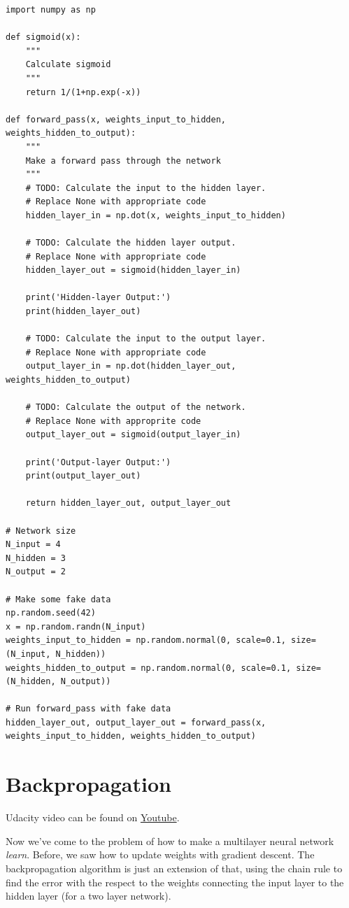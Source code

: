 \begin{lstlisting}
import numpy as np

def sigmoid(x):
    """
    Calculate sigmoid
    """
    return 1/(1+np.exp(-x))

def forward_pass(x, weights_input_to_hidden, weights_hidden_to_output):
    """
    Make a forward pass through the network
    """
    # TODO: Calculate the input to the hidden layer.
    # Replace None with appropriate code
    hidden_layer_in = np.dot(x, weights_input_to_hidden)
    
    # TODO: Calculate the hidden layer output.
    # Replace None with appropriate code
    hidden_layer_out = sigmoid(hidden_layer_in)
    
    print('Hidden-layer Output:')
    print(hidden_layer_out)
    
    # TODO: Calculate the input to the output layer.
    # Replace None with appropriate code
    output_layer_in = np.dot(hidden_layer_out, weights_hidden_to_output)
    
    # TODO: Calculate the output of the network.
    # Replace None with approprite code
    output_layer_out = sigmoid(output_layer_in)
    
    print('Output-layer Output:')
    print(output_layer_out)
    
    return hidden_layer_out, output_layer_out

# Network size
N_input = 4
N_hidden = 3
N_output = 2

# Make some fake data
np.random.seed(42)
x = np.random.randn(N_input)
weights_input_to_hidden = np.random.normal(0, scale=0.1, size=(N_input, N_hidden))
weights_hidden_to_output = np.random.normal(0, scale=0.1, size=(N_hidden, N_output))

# Run forward_pass with fake data
hidden_layer_out, output_layer_out = forward_pass(x, weights_input_to_hidden, weights_hidden_to_output)
\end{lstlisting}

\section{Backpropagation}

Udacity video can be found on \href{https://www.youtube.com/watch?v=MZL97-2joxQ&t=22s&ab_channel=Udacity}{Youtube}. \newline

Now we've come to the problem of how to make a multilayer neural network \textit{learn}. Before, we saw how to update weights with gradient descent. The backpropagation algorithm is just an extension of that, using the chain rule to find the error with the respect to the weights connecting the input layer to the hidden layer (for a two layer network). \newline

